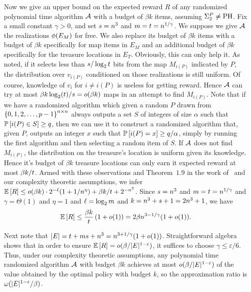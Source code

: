 \begin{proofof}{}
Now we give an upper bound on the expected reward $R$ of any randomized
polynomial time algorithm $\mathcal{A}$ with a budget of $\beta k$ items, 
assuming $\Sigma^P_2 \neq
\textrm{PH}$. 
Fix a small constant $\gamma > 0$, and set $s = n^3$ and $m = t = n^{1/\gamma}$.
%
%
%
%
We suppose we give $\mathcal{A}$ the realizations ${\color{black}{\ensuremath{\phi}}}(E_M)$ for free.
We also replace its budget of $\beta k$ items with a 
budget of $\beta k$ specifically for map items in $E_{M}$ and
an additional budget of $\beta k$ specifically for the treasure locations in
$E_{T}$. 
Obviously, this can only help it. 
As noted, if it selects less than 
$s/\log_{2} t$ bits from the map $M_{i(P)}$ indicated by $P$, the
distribution over $v_{i(P)}$
conditioned on those realizations is still uniform.  Of course,
knowledge of $v_{i}$ for $i \neq i(P)$ is useless for getting reward.
Hence $\mathcal{A}$ can try at most 
$\beta k \log_{2}(t) / s = o(\beta k)$ 
%
%
%
maps in an attempt to find $M_{i(P)}$.
Note that if we have a randomized algorithm which given a random $P$ drawn from 
$\left\{0,1,2,  \ldots, p-1\right\}^{n \times n}$ always outputs a set $S$ of
integers of size $\alpha$ such that $\mathbb{P}\left[i(P) \in S\right]  \ge q$, then we can use it to
construct a randomized algorithm that, given $P$, outputs an integer $x$ such
that $\mathbb{P}\left[i(P) = x\right]  \ge q/\alpha$, simply by running the first algorithm
and then selecting a random item of $S$.
If $\mathcal{A}$ does not find $M_{i(P)}$, the distribution on the treasure's location
is uniform given its knowledge.  Hence it's budget of
$\beta k$ treasure locations can only earn it expected reward at most $\beta k/t$.
Armed with these observations and 
Theorem~$1.9$ in the work of~\citet{FeigeL97} and our complexity theoretic
assumptions, we infer
%
$\mathbb{E}\left[R\right] \le o(\beta k) \cdot  2^{-\ell}(1 + 1/n^{\eta}) +
\beta k/t + 2^{-n^2}$.
Since $s = n^3$ and $m = t = n^{1/\gamma}$ and $\gamma = \Theta(1)$
and $\eta = 1$ and $\ell = \log_{2} m$ and $k = n^3 +
s + 1 = 2 n^3 + 1$,
we have 
$$\mathbb{E}\left[R\right] \le \frac{\beta k}{t} \left( {1 + o(1)} \right)  = 
2\beta n^{3 - 1/\gamma}(1 + o(1))\mbox{.}$$


%
%
\noindent Next note that $|E|=t+m s
+n^{3} =  n^{3+1/\gamma}(1 + o(1))$.
Straightforward algebra shows that in order to ensure
$\mathbb{E}\left[R\right]=o( \beta/|E|^{1-\varepsilon})$, 
it suffices to choose $\gamma \le \varepsilon/6$. Thus, under our
complexity theoretic assumptions, any polynomial time randomized
algorithm $\mathcal{A}$ with budget $\beta k$ achieves at most
$o(\beta / |E|^{1-\varepsilon})$ of the value obtained by the
optimal policy with budget $k$, so the approximation ratio is $\omega(|E|^{1-\varepsilon}/\beta)$.
\end{proofof}


%
%
%
%

